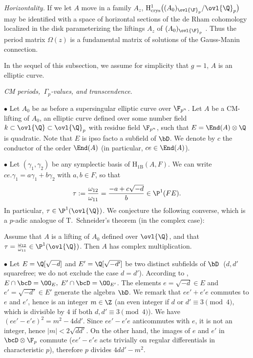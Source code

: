 \begin{para}
 {\itshape Horizontality.} If we let $A$ move in a family $A_z$,
 $\mathrm{H}^1_{\mathrm{crys}}\bigl((A_0)_{\ovl{\F}_p}/\ovl{\Q}_p\bigr)$ may be
 identified with a space of horizontal sections of the de Rham
 cohomology localized in the disk parameterizing the liftings $A_z$ of
 $(A_0)_{\ovl{\F}_p}$ \cite{fadrc1}. Thus the period matrix $\Omega(z)$ is a fundamental
 matrix of solutions of the Gauss-Manin connection.
\end{para}

In the sequel of this subsection, we assume for simplicity that 
 $g=1$, \ie $A$ is an elliptic curve.


\begin{para} {\itshape CM periods, $\,\Gamma_p$-values, and transcendence.}

 \medskip\noindent $\bullet$  Let $A_0$ be as before a
 supersingular elliptic curve over ${\F}_{p^n}$. Let $A$ be a CM-lifting of
 $A_0$, \ie an elliptic curve defined over some number field $k \subset
 \ovl{\Q}\subset \ovl{\Q}_p$ with residue field ${\F}_{p^n}$, such that
 $E= \End(A) \otimes \Q$ is
 quadratic. Note that $E$ is ipso facto a subfield of $\bD$. We denote by
 $c$ the conductor of the
 order $\End(A)$ (in particular, $ce \in \End(A)$).

 \medskip\noindent $\bullet$ Let $(\gamma_1,\gamma_2)$ be any symplectic
 basis of $\mathrm{H}_{1\mathrm{B}}(A,F)$. We can write
 $ce.\gamma_1=a\gamma_1+b\gamma_2$ with $a,b \in F$, so that
 \begin{equation*}
 \tau := \frac{\omega_{12}}{\omega_{11}}=
 \frac{-a+c\sqrt{-d}}{b}\in {\P}^1(FE).
 \end{equation*}
 In particular, $\tau \in {\P}^1({\ovl{\Q}})$.
 We conjecture the following converse, which is a $p$-adic analogue of
 T.~Schneider's theorem \cite{auei} (in the complex case):

 \begin{coj}\label{coj-complex-mult}
  Assume that $A$ is a lifting of $A_0$ defined over $\ovl{\Q}$, and
  that $\tau = \frac{\omega_{12}}{\omega_{11}} \in {\P}^1({\ovl{\Q}})$.
  Then $A$ has complex multiplication.
 \end{coj} 

 
\medskip\noindent $\bullet$ 
 Let $E= {\Q}[\sqrt{-d}]$ and 
 $E'= {\Q}[\sqrt{-d'}]$ be two distinct subfields of
 $\bD\;$ ($d, d'$
 squarefree; we do not exclude the case $d=d'$). According to
 \cite[II 1.4]{adadq}, $E\cap \bcD=\OO_E,\;E'\cap \bcD=\OO_{E'}$. The
 elements  $e = \sqrt{-d}
 \in E$ and $e'=\sqrt{-d'} \in  E'$ generate the
 algebra $\bD$. We remark
 that
 $ee'+e'e$ commutes to $e$ and $e'$, hence is an
 integer $m \in \Z$ (an
 even integer if $d$ or $d'\equiv 3\pmod{4}$, which is divisible by
 $4$ if both $d,
 d'\equiv 3\pmod{4}$). We have
 $(ee'-e'e)^2=m^2-4dd'$. Since
 $ee'-e'e$ anticommutes with $e$, it is not an integer,
 hence $\vert m\vert <
 2\sqrt{dd'}$. On the other hand, the images of $e$ and $e'$
 in $\bcD\otimes
 {\F}_p$ commute ($ee'-e'e$ acts trivially on regular
 differentials in
 characteristic $p$), therefore $p$ divides $4dd'-m^2$. 
 

\end{para}
